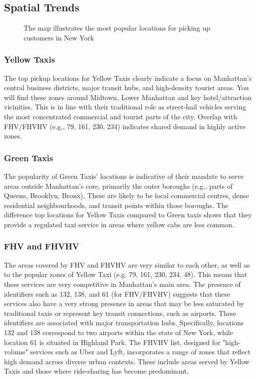 \documentclass[conference]{IEEEtran}
\begin{document}
\subsection{Spatial Trends}

\begin{figure}[htbp]
  \label{fig:most-popular-pickup-locations}
  \centering
  
  \caption{The map illustrates the most popular locations for picking up customers in New York}
\end{figure}

\subsubsection*{Yellow Taxis}
The top pickup locations for Yellow Taxis clearly indicate a focus on Manhattan's central business districts, major
transit hubs, and high-density tourist areas. You will find these zones around Midtown, Lower Manhattan and key
hotel/attraction vicinities. This is in line with their traditional role as street-hail vehicles serving the most
concentrated commercial and tourist parts of the city. Overlap with FHV/FHVHV (e.g., 79, 161, 230, 234) indicates shared
demand in highly active zones.

\subsubsection*{Green Taxis} The popularity of Green Taxis' locations is indicative of their mandate to serve areas
outside Manhattan's core,
primarily the outer boroughs (e.g., parts of Queens, Brooklyn, Bronx). These are likely to be local commercial centres,
dense residential neighbourhoods, and transit points within those boroughs. The difference top locations
for Yellow Taxis compared to Green taxis shows that they provide a regulated taxi service in areas where yellow
cabs are less common.

\subsubsection*{FHV and FHVHV} The areas covered by FHV and FHVHV are very similar to each other, as well as to the
popular zones of Yellow Taxi (e.g. 79, 161, 230, 234, 48). This means that these services are very competitive in
Manhattan's main area. The presence of identifiers such as 132, 138, and 61 (for FHV/FHVHV) suggests that these services
also have a very strong presence in areas that may be less saturated by traditional taxis or represent key transit
connections, such as airports. These identifiers are associated with major transportation hubs. Specifically, locations
132 and 138 correspond to two airports within the state of New York, while location 61 is situated in Highland Park. The
FHVHV list, designed for "high-volume" services such as Uber and Lyft, incorporates a range of zones that reflect high
demand across diverse urban contexts. These include areas served by Yellow Taxis and those where ride-sharing has become
predominant.
\end{document}
